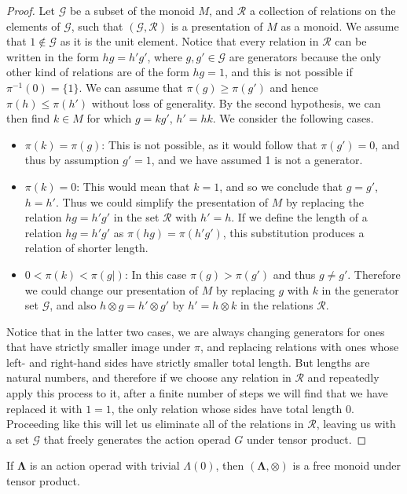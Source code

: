 \documentclass{amsbook} %
\newcommand{\ML}{\mathbf{\Lambda}}
\numberwithin{section}{chapter}
\begin{document}
\begin{proof}
Let $\mathcal{G}$ be a subset of the monoid $M$, and $\mathcal{R}$ a collection of relations on the elements of $\mathcal{G}$, such that $(\mathcal{G},\mathcal{R})$ is a presentation of $M$ as a monoid. We assume that $1 \notin \mathcal{G}$ as it is the unit element. Notice that every relation in $\mathcal{R}$ can be written in the form $h g = h' g'$, where $g,g' \in \mathcal{G}$ are generators because the only other kind of relations are of the form $h  g = 1$, and  this is not possible if $\pi^{-1}(0) = \{1\}$. We can assume that  $\pi(g) \ge \pi(g')$ and hence $\pi(h) \le \pi(h')$ without loss of generality. By the second hypothesis, we can then find $k \in M$ for which $g = k g'$, $h' = h k$. 
We consider the following cases.
\begin{itemize}
\item $\pi(k) = \pi(g)$: This is not possible, as it would follow that $\pi(g')=0$, and thus by assumption $g' = 1$, and we have assumed 1 is not a generator.
\item $\pi(k)=0$: This would mean that $k=1$, and so we conclude that $g=g'$, $h = h'$. Thus we could simplify the presentation of $M$ by replacing the relation $h g = h' g'$ in the set $\mathcal{R}$ with $h' = h$. If we define the length of a relation $h g = h' g'$ as $\pi(hg) = \pi(h'g')$, this substitution produces a relation of shorter length.
\item $0 < \pi(k) < \pi(g|)$: In this case $\pi(g) > \pi(g')$ and thus $g \neq g'$. Therefore we could change our presentation of $M$ by replacing $g$ with $k$ in the generator set $\mathcal{G}$, and also $h \otimes g = h' \otimes g'$ by $h' = h \otimes k$ in the relations $\mathcal{R}$.
\end{itemize}
Notice that in the latter two cases, we
 are always changing generators for ones that have strictly smaller image under $\pi$, and replacing relations with ones whose left- and right-hand sides have strictly smaller total length. But lengths are natural numbers, and therefore if we choose any relation in $\mathcal{R}$ and repeatedly apply this process to it, after a finite number of steps we will find that we have replaced it with $1 = 1$, the only relation whose sides have total length $0$. Proceeding like this will let us eliminate all of the relations in $\mathcal{R}$, leaving us with a set $\mathcal{G}$ that freely generates the action operad $G$ under tensor product.
\end{proof}
\begin{cor}\label{cor:ML_free}
If $\ML$ is an action operad with trivial $\Lambda(0)$, then $(\ML, \otimes)$ is a free monoid under tensor product.
\end{cor}
\end{document}
